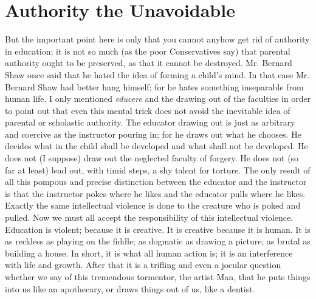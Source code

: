 \documentclass{book}
\begin{document}
\chapter{Authority the Unavoidable}
\label{chapter-37}
But the important point here is only that you cannot anyhow get rid of authority in education; it is not so much (as the poor Conservatives say) that parental authority ought to be preserved, as that it cannot be destroyed. Mr. Bernard Shaw once said that he hated the idea of forming a child’s mind. In that case Mr. Bernard Shaw had better hang himself; for he hates something inseparable from human life. I only mentioned \emph{educere} and the drawing out of the faculties in order to point out that even this mental trick does not avoid the inevitable idea of parental or scholastic authority. The educator drawing out is just as arbitrary and coercive as the instructor pouring in; for he draws out what he chooses. He decides what in the child shall be developed and what shall not be developed. He does not (I suppose) draw out the neglected faculty of forgery. He does not (so far at least) lead out, with timid steps, a shy talent for torture. The only result of all this pompous and precise distinction between the educator and the instructor is that the instructor pokes where he likes and the educator pulls where he likes. Exactly the same intellectual violence is done to the creature who is poked and pulled. Now we must all accept the responsibility of this intellectual violence. Education is violent; because it is creative. It is creative because it is human. It is as reckless as playing on the fiddle; as dogmatic as drawing a picture; as brutal as building a house. In short, it is what all human action is; it is an interference with life and growth. After that it is a trifling and even a jocular question whether we say of this tremendous tormentor, the artist Man, that he puts things into us like an apothecary, or draws things out of us, like a dentist.
\end{document}
